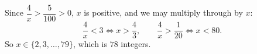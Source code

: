 Since $\dfrac4x>\dfrac{5}{100}>0$, $x$ is positive, and we may multiply through by $x$:
\[\dfrac4x<3\iff x>\dfrac43,\qquad \dfrac4x>\dfrac1{20}\iff x<80.\]
So $x\in\{2,3,\dots,79\}$, which is $\boxed{78}$ integers.
